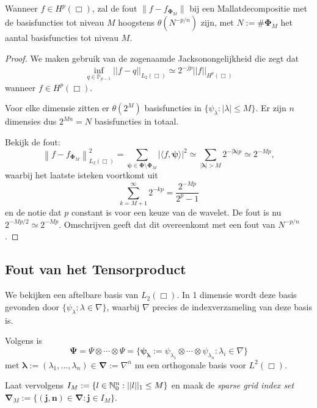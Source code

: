 \begin{stelling}
\label{thm:foutmallat}
Wanneer $f \in H^p(\Box)$, zal de fout $\| f - f_{\boldsymbol\Phi_M} \|$ bij een Mallatdecompositie met de basisfuncties tot niveau $M$ hoogstens $\theta(N^{-p/n})$ zijn, met $N := \# \boldsymbol\Phi_M$ het aantal basisfuncties tot niveau $M$.
\end{stelling}
\begin{proof}

  We maken gebruik van de zogenaamde Jacksonongelijkheid \cite{jackson} die zegt dat 
  \[
  \inf_{q \in \mathbb{P}_{p-1}} ||f - q||_{L_2(\Box)} \simeq 2^{-jp} ||f||_{H^p(\Box)}
  \]
  wanneer $f \in H^p(\Box)$.

  Voor elke dimensie zitten er $\theta(2^M)$ basisfuncties in $\{ \psi_\lambda: |\lambda| \leq M \}$. Er zijn $n$ dimensies dus $2^{Mn} = N$ basisfuncties in totaal.

  Bekijk de fout:
  \[
  \left\| f - f_{\boldsymbol\Phi_M} \right\|^2_{L_2(\Box)} = \sum_{{\boldsymbol\psi} \in \boldsymbol\Phi \setminus \boldsymbol\Phi_M} | \langle f, \boldsymbol\psi \rangle |^2 \simeq \sum_{|\boldsymbol\lambda| > M} 2^{-|\boldsymbol\lambda|p} \simeq 2^{-Mp},
  \]
  waarbij het laatste isteken voortkomt uit
  \[
  \sum_{k=M+1}^\infty 2^{- kp} = \frac{2^{-Mp}}{2^p-1}
  \]
  en de notie dat $p$ constant is voor een keuze van de wavelet. De fout is nu $2^{-Mp/2} \simeq 2^{-Mp}$. Omschrijven geeft dat dit overeenkomt met een fout van $N^{-p/n}$.
\end{proof}

\subsection{Fout van het Tensorproduct}
We bekijken een aftelbare basis van $L_2(\Box)$. In 1 dimensie wordt deze basis gevonden door $\{ \psi_\lambda: \lambda \in \nabla \}$, waarbij $\nabla$ precies de indexverzameling van deze basis is.

Volgens \cite[L3.1.7]{tammo} is 
\[ 
  \boldsymbol\Psi = \Psi \otimes \cdots \otimes \Psi = \{ \boldsymbol{\psi_\lambda} := \psi_{\lambda_1} \otimes \cdots \otimes \psi_{\lambda_n}: \lambda_i \in \nabla \}
\]
met $\boldsymbol\lambda := (\lambda_1, \ldots, \lambda_n) \in \boldsymbol{\nabla} := \nabla^n$ nu een orthogonale basis voor $L^2(\Box)$.

Laat vervolgens $I_M := \{ l \in \mathbb{N}^n_0: ||l||_1 \leq M \}$ en maak de \emph{sparse grid index set} $\boldsymbol{\nabla}_M := \{ \boldsymbol{(j,n)} \in \boldsymbol{\nabla}: \boldsymbol{j} \in I_M \}$.

